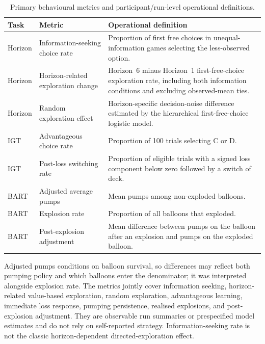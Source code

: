 \documentclass[logo,msc]{infthesis}
\begin{document}
\begin{table}[htbp]
\centering
\caption{Primary behavioural metrics and participant/run-level operational definitions.}
\label{tab:behavioural_metrics}
\begin{tabularx}{\textwidth}{@{}p{1.7cm}p{3.6cm}X@{}}
\toprule
\textbf{Task} & \textbf{Metric} & \textbf{Operational definition} \\
\midrule
Horizon & Information-seeking choice rate & Proportion of first free choices in unequal-information games selecting the less-observed option. \\
Horizon & Horizon-related exploration change & Horizon~6 minus Horizon~1 first-free-choice exploration rate, including both information conditions and excluding observed-mean ties. \\
Horizon & Random exploration effect & Horizon-specific decision-noise difference estimated by the hierarchical first-free-choice logistic model. \\
IGT & Advantageous choice rate & Proportion of 100 trials selecting C or D. \\
IGT & Post-loss switching rate & Proportion of eligible trials with a signed loss component below zero followed by a switch of deck. \\
BART & Adjusted average pumps & Mean pumps among non-exploded balloons. \\
BART & Explosion rate & Proportion of all balloons that exploded. \\
BART & Post-explosion adjustment & Mean difference between pumps on the balloon after an explosion and pumps on the exploded balloon. \\
\bottomrule
\end{tabularx}
\end{table}

Adjusted pumps conditions on balloon survival, so differences may reflect both pumping policy and which balloons enter the denominator; it was interpreted alongside explosion rate. The metrics jointly cover information seeking, horizon-related value-based exploration, random exploration, advantageous learning, immediate loss response, pumping persistence, realised explosions, and post-explosion adjustment. They are observable run summaries or prespecified model estimates and do not rely on self-reported strategy. Information-seeking rate is not the classic horizon-dependent directed-exploration effect.
\end{document}

